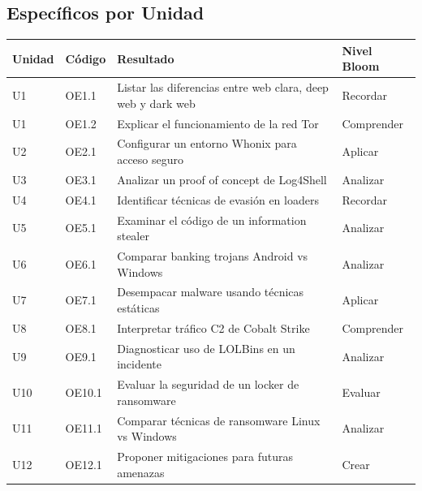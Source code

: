 \documentclass[
  letterpaper,
]{report}
\newcounter{none} %
\begin{document}
\subsection{Específicos por Unidad}\label{especuxedficos-por-unidad}

{\def\LTcaptype{none} %
\begin{longtable}[]{@{}
  >{\raggedright\arraybackslash}p{}
  >{\raggedright\arraybackslash}p{}
  >{\raggedright\arraybackslash}p{}
  >{\raggedright\arraybackslash}p{}@{}}
\toprule\noalign{}
\begin{minipage}[b]{\linewidth}\raggedright
Unidad
\end{minipage} & \begin{minipage}[b]{\linewidth}\raggedright
Código
\end{minipage} & \begin{minipage}[b]{\linewidth}\raggedright
Resultado
\end{minipage} & \begin{minipage}[b]{\linewidth}\raggedright
Nivel Bloom
\end{minipage} \\
\midrule\noalign{}
\endhead
\bottomrule\noalign{}
\endlastfoot
U1 & OE1.1 & Listar las diferencias entre web clara, deep web y dark web
& Recordar \\
U1 & OE1.2 & Explicar el funcionamiento de la red Tor & Comprender \\
U2 & OE2.1 & Configurar un entorno Whonix para acceso seguro &
Aplicar \\
U3 & OE3.1 & Analizar un proof of concept de Log4Shell & Analizar \\
U4 & OE4.1 & Identificar técnicas de evasión en loaders & Recordar \\
U5 & OE5.1 & Examinar el código de un information stealer & Analizar \\
U6 & OE6.1 & Comparar banking trojans Android vs Windows & Analizar \\
U7 & OE7.1 & Desempacar malware usando técnicas estáticas & Aplicar \\
U8 & OE8.1 & Interpretar tráfico C2 de Cobalt Strike & Comprender \\
U9 & OE9.1 & Diagnosticar uso de LOLBins en un incidente & Analizar \\
U10 & OE10.1 & Evaluar la seguridad de un locker de ransomware &
Evaluar \\
U11 & OE11.1 & Comparar técnicas de ransomware Linux vs Windows &
Analizar \\
U12 & OE12.1 & Proponer mitigaciones para futuras amenazas & Crear \\
\end{longtable}
}
\end{document}
